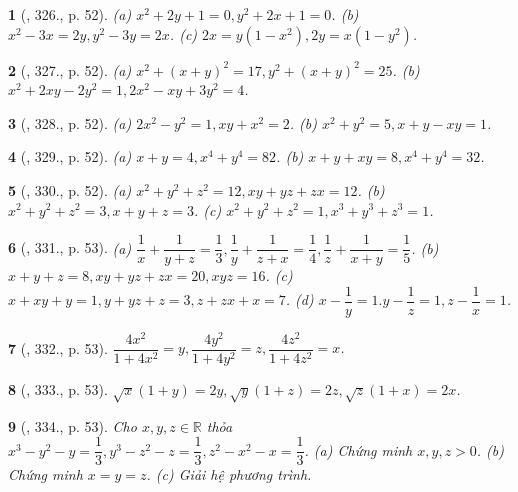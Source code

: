 \documentclass{article}
\newtheorem{baitoan}{}
\begin{document}
\begin{baitoan}[\cite{Binh_Toan_9_tap_2}, 326., p. 52]
	(a) $x^2 + 2y + 1 = 0,y^2 + 2x + 1 = 0$. (b) $x^2 - 3x = 2y,y^2 - 3y = 2x$. (c) $2x = y(1 - x^2),2y = x(1 - y^2)$.
\end{baitoan}

\begin{baitoan}[\cite{Binh_Toan_9_tap_2}, 327., p. 52]
	(a) $x^2 + (x + y)^2 = 17,y^2 + (x + y)^2 = 25$. (b) $x^2 + 2xy - 2y^2 = 1,2x^2 - xy + 3y^2 = 4$.
\end{baitoan}

\begin{baitoan}[\cite{Binh_Toan_9_tap_2}, 328., p. 52]
	(a) $2x^2 - y^2 = 1,xy + x^2 = 2$. (b) $x^2 + y^2 = 5,x + y - xy = 1$.
\end{baitoan}

\begin{baitoan}[\cite{Binh_Toan_9_tap_2}, 329., p. 52]
	(a) $x + y = 4,x^4 + y^4 = 82$. (b) $x + y + xy = 8,x^4 + y^4 = 32$.
\end{baitoan}

\begin{baitoan}[\cite{Binh_Toan_9_tap_2}, 330., p. 52]
	(a) $x^2 + y^2 + z^2 = 12,xy + yz + zx = 12$. (b) $x^2 + y^2 + z^2 = 3,x + y + z = 3$. (c) $x^2 + y^2 + z^2 = 1,x^3 + y^3 + z^3 = 1$.
\end{baitoan}

\begin{baitoan}[\cite{Binh_Toan_9_tap_2}, 331., p. 53]
	(a) $\dfrac{1}{x} + \dfrac{1}{y + z} = \dfrac{1}{3},\dfrac{1}{y} + \dfrac{1}{z + x} = \dfrac{1}{4},\dfrac{1}{z} + \dfrac{1}{x + y} = \dfrac{1}{5}$. (b) $x + y + z = 8,xy + yz + zx = 20,xyz = 16$. (c) $x + xy + y = 1,y + yz + z = 3,z + zx + x = 7$. (d) $x - \dfrac{1}{y} = 1.y - \dfrac{1}{z} = 1,z - \dfrac{1}{x} = 1$.
\end{baitoan}

\begin{baitoan}[\cite{Binh_Toan_9_tap_2}, 332., p. 53]
	$\dfrac{4x^2}{1 + 4x^2} = y,\dfrac{4y^2}{1 + 4y^2} = z,\dfrac{4z^2}{1 + 4z^2} = x$.
\end{baitoan}

\begin{baitoan}[\cite{Binh_Toan_9_tap_2}, 333., p. 53]
	$\sqrt{x}(1 + y) = 2y,\sqrt{y}(1 + z) = 2z,\sqrt{z}(1 + x) = 2x$.
\end{baitoan}

\begin{baitoan}[\cite{Binh_Toan_9_tap_2}, 334., p. 53]
	Cho $x,y,z\in\mathbb{R}$ thỏa $x^3 - y^2 - y = \dfrac{1}{3},y^3 - z^2 - z = \dfrac{1}{3},z^2 - x^2 - x = \dfrac{1}{3}$. (a) Chứng minh $x,y,z > 0$. (b) Chứng minh $x = y = z$. (c) Giải hệ phương trình.
\end{baitoan}
\end{document}
